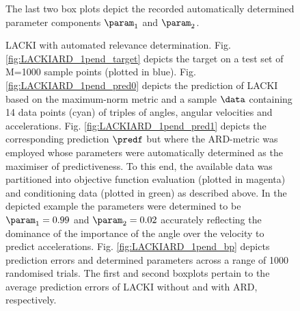 \begin{figure}
        \centering
   \caption{LACKI with automated relevance determination.  Fig. \ref{fig:LACKIARD_1pend_target} depicts the target on a test set of M=1000 sample points (plotted in blue). Fig. \ref{fig:LACKIARD_1pend_pred0} depicts the prediction of LACKI based on the maximum-norm metric and a sample $\data$ containing 14 data points (cyan) of triples of angles, angular velocities and accelerations. Fig. \ref{fig:LACKIARD_1pend_pred1} depicts the corresponding prediction $\predf$ but where the ARD-metric was employed whose parameters were automatically determined as the maximiser of predictiveness. To this end, the available data was partitioned into objective function evaluation (plotted in magenta) and conditioning data (plotted in green) as described above. In the depicted example the parameters were determined to be $\param_1 = 0.99$ and $\param_2 = 0.02$ accurately reflecting the dominance of the importance of the angle over the velocity to predict accelerations.
Fig. \ref{fig:LACKIARD_1pend_bp} depicts prediction errors and determined parameters across a range of 1000 randomised trials. 
The first and second boxplots pertain to the average prediction errors of LACKI without and with ARD, respectively.} The last two box plots depict the recorded automatically determined parameter components $\param_1$ and $\param_2$. 			\label{fig:LACKIARD_1pend}
\end{figure}	




